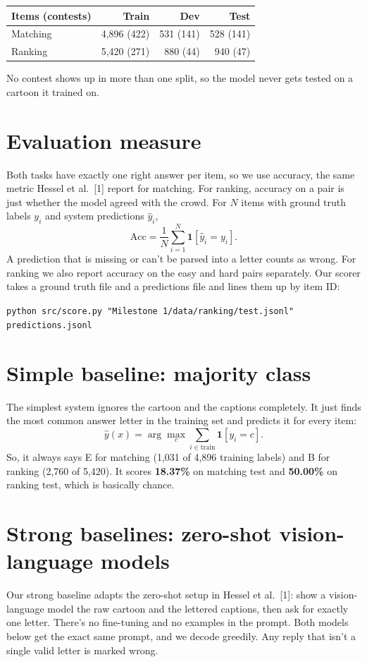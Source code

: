 \documentclass[10pt]{article}
\begin{document}
\begin{center}\small
\begin{tabular}{lrrr}
\toprule
Items (contests) & Train & Dev & Test \\
\midrule
Matching & 4,896 (422) & 531 (141) & 528 (141) \\
Ranking & 5,420 (271) & 880 (44) & 940 (47) \\
\bottomrule
\end{tabular}
\end{center}
\vspace{-0.5em}
No contest shows up in more than one split, so the model never gets tested on a cartoon it trained on. \par

\section{Evaluation measure}
Both tasks have exactly one right answer per item, so we use accuracy, the same metric Hessel et al.~[1] report for matching. For ranking, accuracy on a pair is just whether the model agreed with the crowd. For $N$ items with ground truth labels $y_i$ and system predictions $\hat{y}_i$,
$$\text{Acc} = \frac{1}{N}\sum_{i=1}^{N} \mathbf{1}[\hat{y}_i = y_i].$$
A prediction that is missing or can't be parsed into a letter counts as wrong. For ranking we also report accuracy on the easy and hard pairs separately. Our scorer takes a ground truth file and a predictions file and lines them up by item ID: \par
\vspace{-0.3em}
{\small\verb|python src/score.py "Milestone 1/data/ranking/test.jsonl" predictions.jsonl|}\par

\section{Simple baseline: majority class}
The simplest system ignores the cartoon and the captions completely. It just finds the most common answer letter in the training set and predicts it for every item:
$$\hat{y}(x) = \arg\max_{c} \sum_{i \in \text{train}} \mathbf{1}[y_i = c].$$
So, it always says E for matching (1,031 of 4,896 training labels) and B for ranking (2,760 of 5,420). It scores \textbf{18.37\%} on matching test and \textbf{50.00\%} on ranking test, which is basically chance. \par

\section{Strong baselines: zero-shot vision-language models}
Our strong baseline adapts the zero-shot setup in Hessel et al.~[1]: show a vision-language model the raw cartoon and the lettered captions, then ask for exactly one letter. There's no fine-tuning and no examples in the prompt. Both models below get the exact same prompt, and we decode greedily. Any reply that isn't a single valid letter is marked wrong. \par
\end{document}
